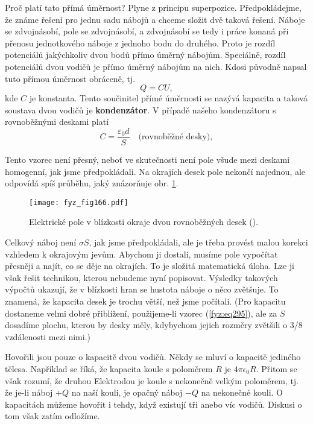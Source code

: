   Proč platí tato přímá úměrnost? Plyne z principu superpozice. Předpokládejme, že známe řešení pro 
  jednu sadu nábojů a chceme složit dvě taková řešení. Náboje se zdvojnásobí, pole se zdvojnásobí, 
  a zdvojnásobí se tedy i práce konaná při přenosu jednotkového náboje z jednoho bodu do druhého. 
  Proto je rozdíl potenciálů jakýchkoliv dvou bodů přímo úměrný nábojům. Speciálně, rozdíl 
  potenciálů dvou vodičů je přímo úměrný nábojům na nich. Kdosi původně napsal tuto přímou úměrnost 
  obráceně, tj.
  \begin{equation}\label{fyz:eq294}
    Q = CU,
  \end{equation}
  kde \(C\) je konstanta. Tento součinitel přímé úměrnosti se nazývá kapacita a taková soustava 
  dvou vodičů je \textbf{kondenzátor}. V případě našeho kondenzátoru s rovnoběžnými deskami platí
  \begin{equation}\label{fyz:eq295}
    C = \frac{\varepsilon_0d}{S} \quad\text{(rovnoběžné desky)},
  \end{equation}
  
  Tento vzorec není přesný, neboť ve skutečnosti není pole všude mezi deskami homogenní, jak jsme 
  předpokládali. Na okrajích desek pole nekončí najednou, ale odpovídá spíš průběhu,
  jaký znázorňuje obr. \ref{fyz:fig166}.
  
  \begin{figure}[ht!]  %
    \centering
    \texttt{[image: fyz\_fig166.pdf]}
    \caption{Elektrické pole v blízkosti okraje dvou rovnoběžných desek
             (\cite[s.~115]{Feynman02}).}
    \label{fyz:fig166}
  \end{figure}

  Celkový náboj není \(σS\), jak jsme předpokládali, ale je třeba provést malou korekci vzhledem k
  okrajovým jevům. Abychom ji dostali, musíme pole vypočítat přesněji a najít, co se děje na
  okrajích. To je složitá matematická úloha. Lze ji však řešit technikou, kterou nebudeme nyní
  popisovat. Výsledky takových výpočtů ukazují, že v blízkosti hran se hustota náboje o něco
  zvětšuje. To znamená, že kapacita desek je trochu větší, než jsme počítali. (Pro kapacitu
  dostaneme velmi dobré přiblížení, použijeme-li vzorec (\ref{fyz:eq295}), ale za \(S\) dosadíme
  plochu, kterou by desky měly, kdybychom jejich rozměry zvětšili o 3/8 vzdálenosti mezi nimi.)
  
  Hovořili jsou pouze o kapacitě dvou vodičů. Někdy se mluví o kapacitě jediného tělesa. Například
  se říká, že kapacita koule s poloměrem \(R\) je \(4πϵ_0R\). Přitom se však rozumí, že druhou
  Elektrodou je koule s nekonečně velkým poloměrem, tj. že je-li náboj \(+Q\) na naší kouli, je
  opačný náboj \(-Q\) na nekonečné kouli. O kapacitách můžeme hovořit i tehdy, když existují tři
  anebo víc vodičů. Diskusi o tom však zatím odložíme.

